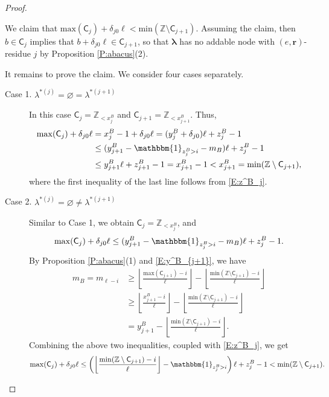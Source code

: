\documentclass[11pt,a4paper,reqno]{amsart}
\numberwithin{equation}{section}
\theoremstyle{plain}
\theoremstyle{definition}
\theoremstyle{remark}
\numberwithin{equation}{section}
\newcommand{\bbone}{\mathbbm{1}}
\newcommand{\bl}{\boldsymbol{\lambda}}
\newcommand{\br}{\mathbf{r}}
\renewcommand{\min}{\mathrm{min}}
\renewcommand{\max}{\mathrm{max}}
\newcommand{\ZZ}{\mathbb{Z}}
\newcommand{\C}{\mathsf{C}}
\begin{document}
\begin{proof}
\begin{description}
We claim that $\max(\C_j) + \delta_{j0} \ell < \min (\ZZ \setminus \C_{j+1})$.
Assuming the claim, then $b \in \C_j$ implies that $b + \delta_{j0} \ell \in \C_{j+1}$, so that $\bl$ has no addable node with $(e,\br)$-residue $j$ by Proposition \ref{P:abacus}(2).

It remains to prove the claim.  We consider four cases separately.

\begin{description}
  \item[Case 1. $\lambda^{*(j)} = \varnothing = \lambda^{*(j+1)}$]
  In this case $\C_j = \ZZ_{< x^B_j}$ and $\C_{j+1} = \ZZ_{<x^B_{j+1}}$.
  Thus,
  \begin{align*}
    \max(\C_j) + \delta_{j0}\ell &=  x^B_j -1 + \delta_{j0}\ell = (y^B_j + \delta_{j0})\ell + z^B_{j} - 1 
    \\
    &\leq (y^B_{j+1} - \bbone_{z_j^B > i} - m_B)\ell + z^B_j -1 \\
    &\leq y^B_{j+1} \ell + z^B_{j+1} -1 = x^B_{j+1} -1 < x^B_{j+1} = \min(\ZZ \setminus \C_{j+1}) ,
  \end{align*}
  where the first inequality of the last line follows from \eqref{E:z^B_j}.

  \item[Case 2. $\lambda^{*(j)} = \varnothing \ne \lambda^{*(j+1)}$]
  Similar to Case 1, we obtain $\C_j = \ZZ_{< x^B_j}$, and %
  $$
  \max(\C_j) + \delta_{j0}\ell %
  \leq (y^B_{j+1} - \bbone_{z_j^B > i} - m_B)\ell + z^B_j - 1.$$
  By Proposition \ref{P:abacus}(1) and \eqref{E:y^B_{j+1}}, we have
  \begin{align*}
  m_B = m_{\ell - i}
  &\geq \left \lfloor \frac{\max(\C_{j+1}) - i}{\ell} \right\rfloor - \left \lfloor \frac{\min(\ZZ\setminus \C_{j+1}) -i}{\ell} \right\rfloor \\
  &\geq \left \lfloor \frac{x^B_{j+1} - i}{\ell} \right\rfloor - \left \lfloor \frac{\min(\ZZ\setminus \C_{j+1}) -i}{\ell} \right\rfloor \\
  &= y^B_{j+1} - \left \lfloor \frac{\min(\ZZ\setminus \C_{j+1}) -i}{\ell} \right\rfloor.
  \end{align*}
  Combining the above two inequalities, coupled with \eqref{E:z^B_j}, we get
  \begin{align*}
    \max(\C_j) + \delta_{j0}\ell &\leq \left(\left \lfloor \frac{\min(\ZZ\setminus \C_{j+1}) -i}{\ell} \right\rfloor - \bbone_{z^B_j > i} \right) \ell + z_j^B -1
    < \min(\ZZ \setminus \C_{j+1}).
  \end{align*}


\end{description}
\end{description}
\end{proof}
\end{document}
